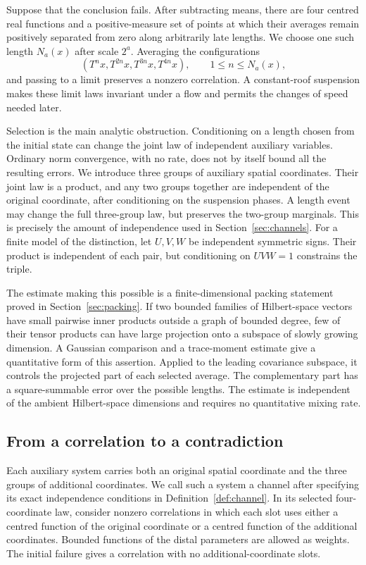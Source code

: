 Suppose that the conclusion fails. After subtracting means, there are
four centred real functions and a positive-measure set of points at
which their averages remain positively separated from zero along
arbitrarily late lengths. We choose one such length $N_a(x)$ after
scale $2^a$. Averaging the configurations
\[
 (T^nx,T^{2n}x,T^{3n}x,T^{4n}x),\qquad 1\le n\le N_a(x),
\]
and passing to a limit preserves a nonzero correlation. A constant-roof
suspension makes these limit laws invariant under a flow and permits
the changes of speed needed later.

Selection is the main analytic obstruction. Conditioning on a length
chosen from the initial state can change the joint law of independent
auxiliary variables. Ordinary norm convergence, with no
rate, does not by itself bound all the resulting errors. We introduce
three groups of auxiliary spatial coordinates. Their joint law is a
product, and any two groups together are independent of the original
coordinate, after conditioning on the suspension phases. A length
event may change the full three-group law, but preserves the
two-group marginals. This is precisely the amount of independence used
in Section~\ref{sec:channels}. For a finite model of the distinction,
let $U,V,W$ be independent symmetric signs. Their product is independent
of each pair, but conditioning on $UVW=1$ constrains the triple.

The estimate making this possible is a finite-dimensional packing
statement proved in Section~\ref{sec:packing}. If two bounded families
of Hilbert-space vectors have small pairwise inner products outside a
graph of bounded degree, few of their tensor products can have large
projection onto a subspace of slowly growing dimension. A Gaussian
comparison and a trace-moment estimate give a quantitative form of
this assertion. Applied to the leading covariance subspace, it controls
the projected part of each selected average. The complementary part
has a square-summable error over the possible lengths. The estimate is
independent of the ambient Hilbert-space dimensions and requires no
quantitative mixing rate.

\subsection*{From a correlation to a contradiction}

Each auxiliary system carries both an original spatial coordinate and
the three groups of additional coordinates. We call such a system a
channel after specifying its exact independence conditions in
Definition~\ref{def:channel}. In its selected four-coordinate law,
consider nonzero correlations in which each slot uses either a
centred function of the original coordinate or a centred function of
the additional coordinates. Bounded functions of the distal parameters
are allowed as weights. The initial failure gives a correlation with
no additional-coordinate slots.

